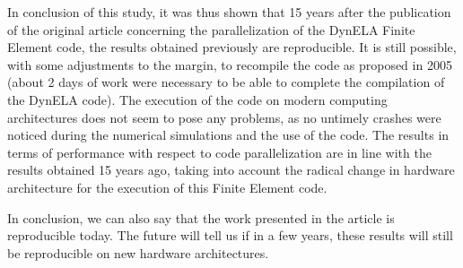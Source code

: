 \documentclass{article}
\begin{document}
In conclusion of this study, it was thus shown that 15 years after the publication of the original article \cite{Pantale:2005} concerning the parallelization of the DynELA Finite Element code, the results obtained previously are reproducible. It is still possible, with some adjustments to the margin, to recompile the code as proposed in 2005 (about 2 days of work were necessary to be able to complete the compilation of the DynELA code). The execution of the code on modern computing architectures does not seem to pose any problems, as no untimely crashes were noticed during the numerical simulations and the use of the code. The results in terms of performance with respect to code parallelization are in line with the results obtained 15 years ago, taking into account the radical change in hardware architecture for the execution of this Finite Element code.

In conclusion, we can also say that the work presented in the article \cite{Pantale:2005} is reproducible today. The future will tell us if in a few years, these results will still be reproducible on new hardware architectures.



\end{document}
